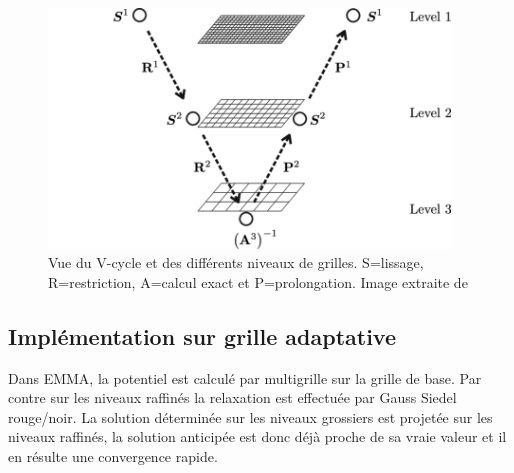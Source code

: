 \begin{figure}
	\begin{center}
	\includegraphics[width=0.95\textwidth]{img/02/Vcycle2.png}
	\caption[Multigrille]{Vue du V-cycle et des différents niveaux de grilles.
	 S=lissage, R=restriction, A=calcul exact et P=prolongation.
	 Image extraite de \cite{multigrid}
	 \label{fig:mgrid}}
	\end{center}
\end{figure}	


\subsection{Implémentation sur grille adaptative}

Dans EMMA, la potentiel est calculé par multigrille sur la grille de base. %
Par contre sur les niveaux raffinés la relaxation est effectuée par Gauss Siedel rouge/noir. %
La solution déterminée sur les niveaux grossiers est projetée sur les niveaux raffinés, la solution anticipée est donc déjà proche de sa vraie valeur et il en résulte une convergence rapide.

%


